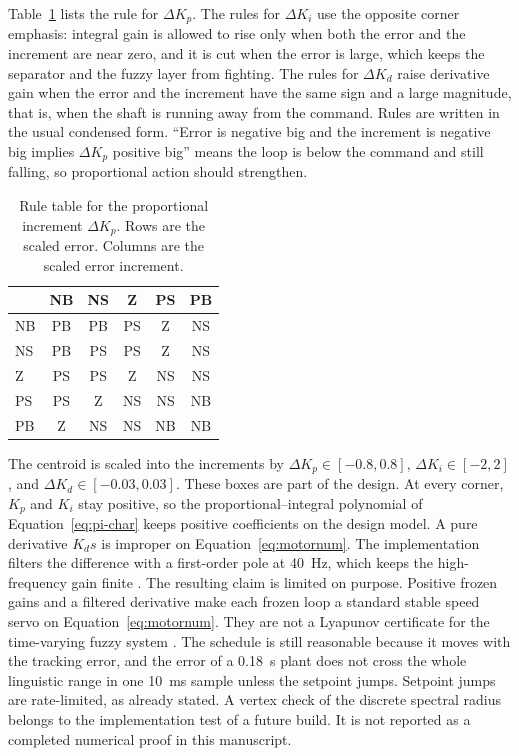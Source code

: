 Table~\ref{tab:fuzzy} lists the rule for $\Delta K_p$. The rules for $\Delta K_i$ use the opposite corner emphasis: integral gain is allowed to rise only when both the error and the increment are near zero, and it is cut when the error is large, which keeps the separator and the fuzzy layer from fighting. The rules for $\Delta K_d$ raise derivative gain when the error and the increment have the same sign and a large magnitude, that is, when the shaft is running away from the command. Rules are written in the usual condensed form. ``Error is negative big and the increment is negative big implies $\Delta K_p$ positive big'' means the loop is below the command and still falling, so proportional action should strengthen.

\begin{table}[htbp]
\centering
\caption{Rule table for the proportional increment $\Delta K_p$. Rows are the scaled error. Columns are the scaled error increment.}
\label{tab:fuzzy}
\begin{tabular}{@{}lccccc@{}}
\toprule
 & NB & NS & Z & PS & PB \\
\midrule
NB & PB & PB & PS & Z & NS \\
NS & PB & PS & PS & Z & NS \\
Z & PS & PS & Z & NS & NS \\
PS & PS & Z & NS & NS & NB \\
PB & Z & NS & NS & NB & NB \\
\bottomrule
\end{tabular}
\end{table}

The centroid is scaled into the increments by $\Delta K_p \in [-0.8, 0.8]$, $\Delta K_i \in [-2, 2]$, and $\Delta K_d \in [-0.03, 0.03]$. These boxes are part of the design. At every corner, $K_p$ and $K_i$ stay positive, so the proportional--integral polynomial of Equation~\eqref{eq:pi-char} keeps positive coefficients on the design model. A pure derivative $K_d s$ is improper on Equation~\eqref{eq:motornum}. The implementation filters the difference with a first-order pole at 40~Hz, which keeps the high-frequency gain finite \cite{astrom2006}. The resulting claim is limited on purpose. Positive frozen gains and a filtered derivative make each frozen loop a standard stable speed servo on Equation~\eqref{eq:motornum}. They are not a Lyapunov certificate for the time-varying fuzzy system \cite{khalil2002}. The schedule is still reasonable because it moves with the tracking error, and the error of a 0.18~s plant does not cross the whole linguistic range in one 10~ms sample unless the setpoint jumps. Setpoint jumps are rate-limited, as already stated. A vertex check of the discrete spectral radius belongs to the implementation test of a future build. It is not reported as a completed numerical proof in this manuscript.


